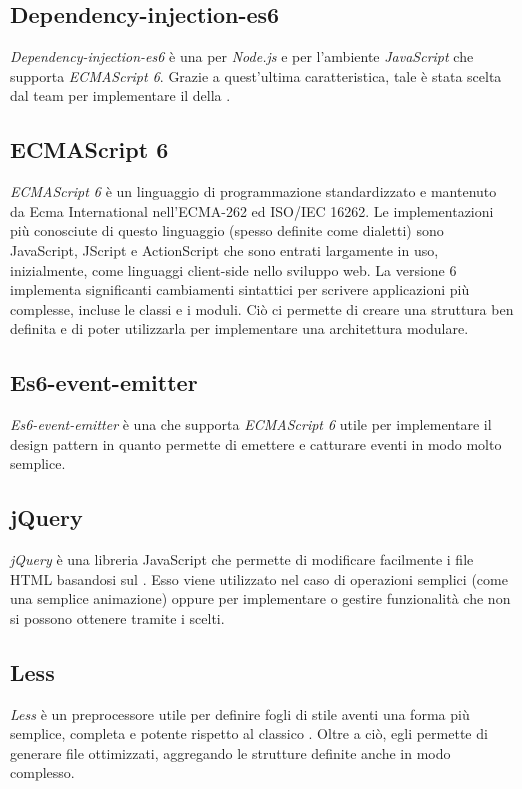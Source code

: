 \subsection{Dependency-injection-es6}
\textit{Dependency-injection-es6} è una  per \textit{Node.js} e  per l'ambiente \textit{JavaScript} che supporta \textit{ECMAScript 6}. Grazie a quest'ultima caratteristica, tale  è stata scelta dal team per implementare il  della .

\subsection{ECMAScript 6}
\textit{ECMAScript 6} è un linguaggio di programmazione standardizzato e mantenuto da Ecma International nell'ECMA-262 ed ISO/IEC 16262. Le implementazioni più conosciute di questo linguaggio (spesso definite come dialetti) sono JavaScript, JScript e ActionScript che sono entrati largamente in uso, inizialmente, come linguaggi client-side nello sviluppo web. La versione 6 implementa significanti cambiamenti sintattici per scrivere applicazioni più complesse, incluse le classi e i moduli. Ciò ci permette di creare una struttura ben definita e di poter utilizzarla per implementare una architettura modulare.

\subsection{Es6-event-emitter}
\textit{Es6-event-emitter} è una  che supporta \textit{ECMAScript 6} utile per implementare il design pattern  in quanto permette di emettere e catturare eventi in modo molto semplice.

\subsection{jQuery}
\textit{jQuery} è una libreria JavaScript che permette di modificare facilmente i file HTML basandosi sul . Esso viene utilizzato nel caso di operazioni semplici (come una semplice animazione) oppure per implementare o gestire funzionalità che non si possono ottenere tramite i  scelti.

\subsection{Less}
\textit{Less} è un preprocessore  utile per definire fogli di stile aventi una forma più semplice, completa e potente rispetto al classico . Oltre a ciò, egli permette di generare file  ottimizzati, aggregando le strutture definite anche in modo complesso.

